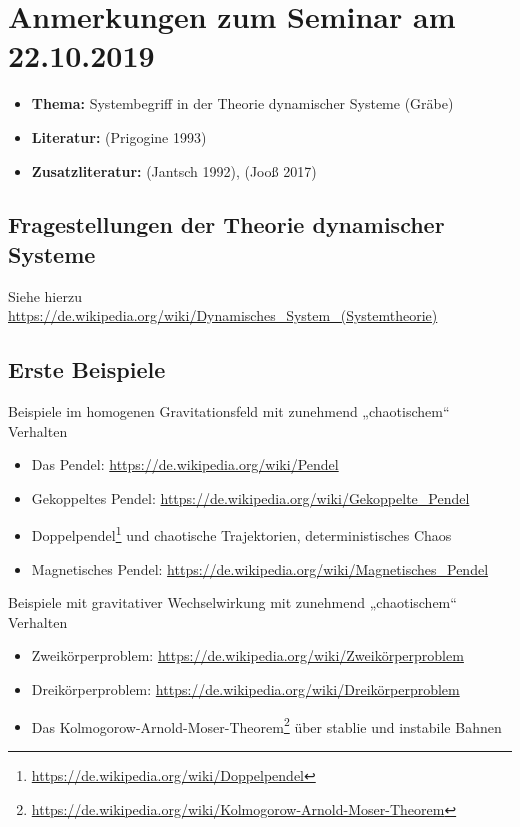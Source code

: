 \documentclass[11pt,a4paper]{article}
\begin{document}
\section{Anmerkungen zum Seminar am 22.10.2019}
\begin{itemize}
\item \textbf{Thema:} Systembegriff in der Theorie dynamischer Systeme (Gräbe)
\item \textbf{Literatur:} (Prigogine 1993)
\item \textbf{Zusatzliteratur:} (Jantsch 1992), (Jooß 2017)
\end{itemize}

\subsection{Fragestellungen der Theorie dynamischer Systeme}

Siehe hierzu
\url{https://de.wikipedia.org/wiki/Dynamisches_System_(Systemtheorie)} 

\subsection{Erste Beispiele}

Beispiele im homogenen Gravitationsfeld mit zunehmend „chaotischem“ Verhalten
\begin{itemize}
\item Das Pendel: \url{https://de.wikipedia.org/wiki/Pendel}
\item Gekoppeltes Pendel:
  \url{https://de.wikipedia.org/wiki/Gekoppelte_Pendel}
\item Doppelpendel\footnote{\url{https://de.wikipedia.org/wiki/Doppelpendel}}
  und chaotische Trajektorien, deterministisches Chaos
\item Magnetisches Pendel:
  \url{https://de.wikipedia.org/wiki/Magnetisches_Pendel}
\end{itemize}
Beispiele mit gravitativer Wechselwirkung mit zunehmend „chaotischem“
Verhalten
\begin{itemize}
\item Zweikörperproblem: \url{https://de.wikipedia.org/wiki/Zweikörperproblem}
\item Dreikörperproblem: \url{https://de.wikipedia.org/wiki/Dreikörperproblem}
\item Das
  Kolmogorow-Arnold-Moser-Theorem\footnote{\url{https://de.wikipedia.org/wiki/Kolmogorow-Arnold-Moser-Theorem}}
  über stablie und instabile Bahnen
\end{itemize}
\end{document}
